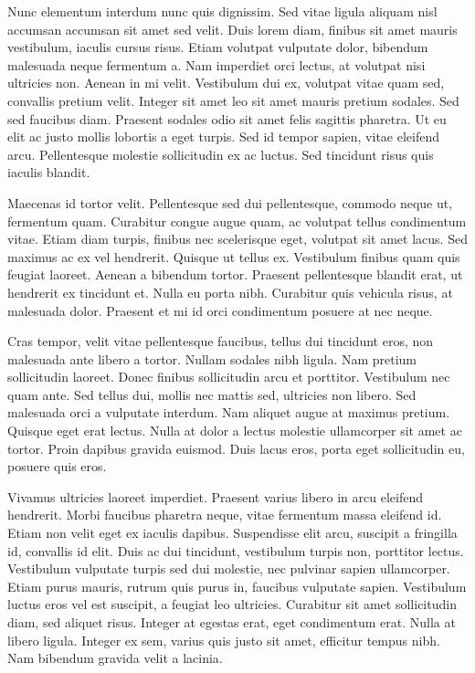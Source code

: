 Nunc elementum interdum nunc quis dignissim. Sed vitae ligula aliquam nisl
accumsan accumsan sit amet sed velit. Duis lorem diam, finibus sit amet mauris
vestibulum, iaculis cursus risus. Etiam volutpat vulputate dolor, bibendum
malesuada neque fermentum a. Nam imperdiet orci lectus, at volutpat nisi
ultricies non. Aenean in mi velit. Vestibulum dui ex, volutpat vitae quam sed,
convallis pretium velit. Integer sit amet leo sit amet mauris pretium sodales.
Sed sed faucibus diam. Praesent sodales odio sit amet felis sagittis pharetra.
Ut eu elit ac justo mollis lobortis a eget turpis. Sed id tempor sapien, vitae
eleifend arcu. Pellentesque molestie sollicitudin ex ac luctus. Sed tincidunt
risus quis iaculis blandit.

Maecenas id tortor velit. Pellentesque sed dui pellentesque, commodo neque ut,
fermentum quam. Curabitur congue augue quam, ac volutpat tellus condimentum
vitae. Etiam diam turpis, finibus nec scelerisque eget, volutpat sit amet
lacus. Sed maximus ac ex vel hendrerit. Quisque ut tellus ex. Vestibulum
finibus quam quis feugiat laoreet. Aenean a bibendum tortor. Praesent
pellentesque blandit erat, ut hendrerit ex tincidunt et. Nulla eu porta nibh.
Curabitur quis vehicula risus, at malesuada dolor. Praesent et mi id orci
condimentum posuere at nec neque.

Cras tempor, velit vitae pellentesque faucibus, tellus dui tincidunt eros, non
malesuada ante libero a tortor. Nullam sodales nibh ligula. Nam pretium
sollicitudin laoreet. Donec finibus sollicitudin arcu et porttitor. Vestibulum
nec quam ante. Sed tellus dui, mollis nec mattis sed, ultricies non libero. Sed
malesuada orci a vulputate interdum. Nam aliquet augue at maximus pretium.
Quisque eget erat lectus. Nulla at dolor a lectus molestie ullamcorper sit amet
ac tortor. Proin dapibus gravida euismod. Duis lacus eros, porta eget
sollicitudin eu, posuere quis eros.

Vivamus ultricies laoreet imperdiet. Praesent varius libero in arcu eleifend
hendrerit. Morbi faucibus pharetra neque, vitae fermentum massa eleifend id.
Etiam non velit eget ex iaculis dapibus. Suspendisse elit arcu, suscipit a
fringilla id, convallis id elit. Duis ac dui tincidunt, vestibulum turpis non,
porttitor lectus. Vestibulum vulputate turpis sed dui molestie, nec pulvinar
sapien ullamcorper. Etiam purus mauris, rutrum quis purus in, faucibus
vulputate sapien. Vestibulum luctus eros vel est suscipit, a feugiat leo
ultricies. Curabitur sit amet sollicitudin diam, sed aliquet risus. Integer at
egestas erat, eget condimentum erat. Nulla at libero ligula. Integer ex sem,
varius quis justo sit amet, efficitur tempus nibh. Nam bibendum gravida velit a
lacinia.

